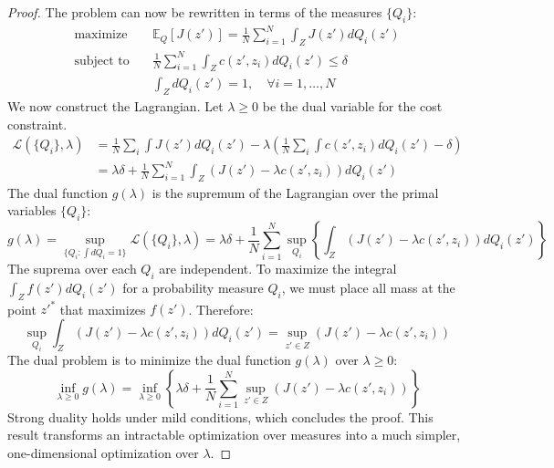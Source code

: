 \documentclass[12pt]{report}
\begin{document}
\begin{proof}
The problem can now be rewritten in terms of the measures $\{Q_i\}$:
\begin{align*}
\text{maximize} \quad & \mathbb{E}_Q[J(z')] = \frac{1}{N}\sum_{i=1}^N \int_Z J(z') dQ_i(z') \\
\text{subject to} \quad & \frac{1}{N}\sum_{i=1}^N \int_Z c(z', z_i) dQ_i(z') \le \delta \\
& \int_Z dQ_i(z') = 1, \quad \forall i=1, \dots, N
\end{align*}
We now construct the Lagrangian. Let $\lambda \ge 0$ be the dual variable for the cost constraint.
\begin{align*}
\mathcal{L}(\{Q_i\}, \lambda) &= \frac{1}{N}\sum_i \int J(z') dQ_i(z') - \lambda \left( \frac{1}{N}\sum_i \int c(z', z_i) dQ_i(z') - \delta \right) \\
&= \lambda\delta + \frac{1}{N}\sum_{i=1}^N \int_Z \left( J(z') - \lambda c(z', z_i) \right) dQ_i(z')
\end{align*}
The dual function $g(\lambda)$ is the supremum of the Lagrangian over the primal variables $\{Q_i\}$:
\[
g(\lambda) = \sup_{\{Q_i : \int dQ_i = 1\}} \mathcal{L}(\{Q_i\}, \lambda) = \lambda\delta + \frac{1}{N}\sum_{i=1}^N \sup_{Q_i} \left\{ \int_Z \left( J(z') - \lambda c(z', z_i) \right) dQ_i(z') \right\}
\]
The suprema over each $Q_i$ are independent. To maximize the integral $\int_Z f(z') dQ_i(z')$ for a probability measure $Q_i$, we must place all mass at the point $z'^*$ that maximizes $f(z')$. Therefore:
\[
\sup_{Q_i} \int_Z \left( J(z') - \lambda c(z', z_i) \right) dQ_i(z') = \sup_{z' \in Z} \left( J(z') - \lambda c(z', z_i) \right)
\]
The dual problem is to minimize the dual function $g(\lambda)$ over $\lambda \ge 0$:
\[
\inf_{\lambda \ge 0} g(\lambda) = \inf_{\lambda \ge 0} \left\{ \lambda\delta + \frac{1}{N}\sum_{i=1}^N \sup_{z' \in Z} \left( J(z') - \lambda c(z', z_i) \right) \right\}
\]
Strong duality holds under mild conditions, which concludes the proof. This result transforms an intractable optimization over measures into a much simpler, one-dimensional optimization over $\lambda$.
\end{proof}


\end{document}
